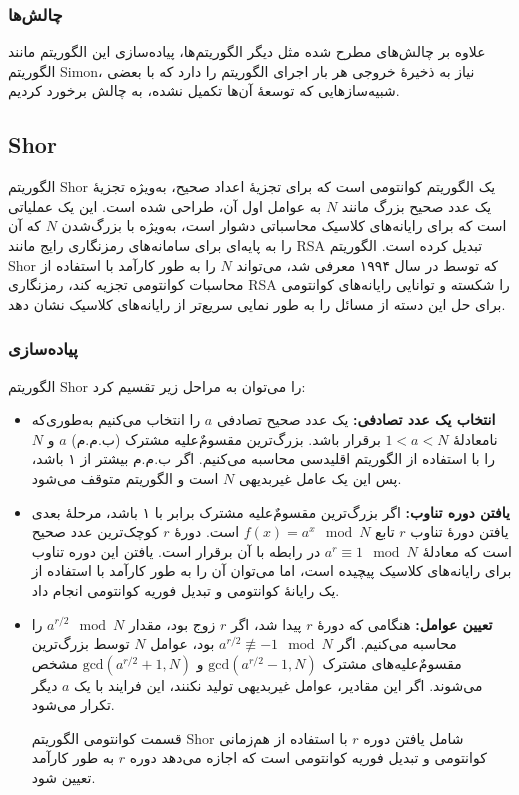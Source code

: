 \subsubsection{چالش‌ها}
علاوه بر چالش‌های مطرح شده مثل دیگر الگوریتم‌ها، پیاده‌سازی این الگوریتم مانند الگوریتم Simon، نیاز به ذخیرهٔ خروجی هر بار اجرای الگوریتم را دارد که با بعضی شبیه‌سازهایی که توسعهٔ آن‌ها تکمیل نشده، به چالش برخورد کردیم.
\subsection{Shor}
الگوریتم Shor یک الگوریتم کوانتومی است که برای تجزیهٔ اعداد صحیح، به‌ویژه تجزیهٔ یک عدد صحیح بزرگ مانند \(N \) به عوامل اول آن، طراحی شده است. این یک عملیاتی است که برای رایانه‌های کلاسیک محاسباتی دشوار است، به‌ویژه با بزرگ‌شدن \(N \) که آن را به پایه‌ای برای سامانه‌های رمزنگاری رایج مانند RSA تبدیل کرده است. الگوریتم Shor که توسط  در سال ۱۹۹۴ معرفی شد، می‌تواند \(N \) را به طور کارآمد با استفاده از محاسبات کوانتومی تجزیه کند، رمزنگاری RSA را شکسته و توانایی رایانه‌های کوانتومی برای حل این دسته از مسائل را به طور نمایی سریع‌تر از رایانه‌های کلاسیک نشان دهد.

\subsubsection{پیاده‌سازی}
الگوریتم Shor را می‌توان به مراحل زیر تقسیم کرد: 
\begin{itemize}
	\item \textbf{انتخاب یک عدد تصادفی:}
	یک عدد صحیح تصادفی \(a \) را انتخاب می‌کنیم به‌طوری‌که نامعادلهٔ \(1 < a < N \) برقرار باشد. بزرگ‌ترین مقسومٌ‌علیه مشترک (ب.م.م) \(a \) و \(N \) را با استفاده از الگوریتم اقلیدسی محاسبه می‌کنیم. اگر ب.م.م بیشتر از ۱ باشد، پس این یک عامل غیربدیهی \(N \) است و الگوریتم متوقف می‌شود.
	\item \textbf{یافتن دوره تناوب:}
	اگر بزرگ‌ترین مقسومٌ‌علیه مشترک برابر با ۱ باشد، مرحلهٔ بعدی یافتن دورهٔ تناوب \(r \) تابع \(f(x) = a^x \mod N \) است. دورهٔ \(r \) کوچک‌ترین عدد صحیح است که معادلهٔ \(a^r \equiv 1 \mod N \) در رابطه با آن برقرار است. یافتن این دوره تناوب برای رایانه‌های کلاسیک پیچیده است، اما می‌توان آن را به طور کارآمد با استفاده از یک رایانهٔ کوانتومی و تبدیل فوریه کوانتومی انجام داد.
	\item \textbf{تعیین عوامل:}
	هنگامی که دورهٔ \(r \) پیدا شد، اگر \(r \) زوج بود، مقدار \(a^{r/2} \mod N \) را محاسبه می‌کنیم. اگر \(a^{r/2} \not\equiv -1 \mod N \) بود، عوامل \(N \) توسط بزرگ‌ترین مقسومٌ‌علیه‌های مشترک \(\text{gcd} (a^{r/2} - 1, N) \) و \(\text{gcd} (a^{r/2} + 1, N) \) مشخص می‌شوند. اگر این مقادیر، عوامل غیربدیهی تولید نکنند، این فرایند با یک \(a \) دیگر تکرار می‌شود.
	
	قسمت کوانتومی الگوریتم Shor شامل یافتن دوره \(r \) با استفاده از هم‌زمانی کوانتومی و تبدیل فوریه کوانتومی است که اجازه می‌دهد دوره \(r \) به طور کارآمد تعیین شود.
\end{itemize}

